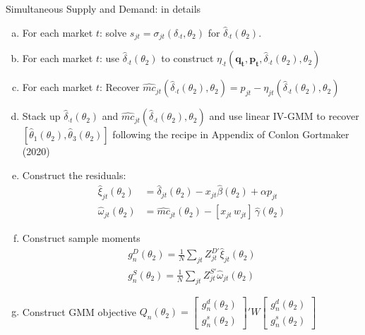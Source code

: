 \documentclass[aspectratio=169,10pt]{beamer}
\begin{document}
\begin{frame}{Simultaneous Supply and Demand: in details}
\footnotesize
\begin{enumerate}[(a)]
\item For each market $t$: solve $s_{jt} = \sigma_{jt}(\delta_{\cdot t},\theta_2)$ for $\widehat{\delta}_{\cdot t}(\theta_2)$.
\item For each market $t$: use $\widehat{\delta}_{\cdot t}(\theta_2)$ to construct $\eta_{\cdot 
t}(\symbf{q_t},\symbf{p_t},\widehat{\delta}_{\cdot t}(\theta_2),\theta_2)$
\item For each market $t$: Recover $\widehat{mc}_{jt}(\widehat{\delta}_{\cdot t}(\theta_2),\theta_2) = p_{jt} - \eta_{jt}(\widehat{\delta}_{\cdot t}(\theta_2),\theta_2)$
\item Stack up $\widehat{\delta}_{\cdot t}(\theta_2)$ and $\widehat{mc}_{jt}(\widehat{\delta}_{\cdot t}(\theta_2),\theta_2)$ and use linear IV-GMM to recover $[\widehat{\theta}_1(\theta_2), \widehat{\theta}_3(\theta_2) ]$ following the recipe in Appendix of Conlon Gortmaker (2020)
\item Construct the residuals:
\begin{align*}
\nonumber    \widehat{\xi}_{jt}(\theta_2) &= \widehat{\delta}_{jt}(\theta_2) -  x_{jt} \widehat{\beta}(\theta_2) + \alpha p_{jt}\\
    \widehat{\omega}_{jt}(\theta_2) &= \widehat{mc}_{jt}(\theta_2) -  [x_{jt}\, w_{jt}]\, \widehat{\gamma}(\theta_2)
\end{align*}
\item Construct sample moments
\begin{align*}
\nonumber g_n^D(\theta_2)=\frac{1}{N} \sum_{jt} Z_{jt}^{D\prime} \widehat{\xi}_{jt}(\theta_2)\\
 g_n^S(\theta_2)=\frac{1}{N} \sum_{jt} Z_{jt}^{S \prime} \widehat{\omega}_{jt}(\theta_2)
\end{align*}
\item Construct GMM objective $Q_n(\theta_2)= \left[ {\begin{array}{c} g_n^d(\theta_2) \\ g_n^s(\theta_2) \end{array} } \right]' W  \left[ {\begin{array}{c} g_n^d(\theta_2) \\ g_n^s(\theta_2) \end{array} } \right] $
\end{enumerate}
\end{frame}
\end{document}
